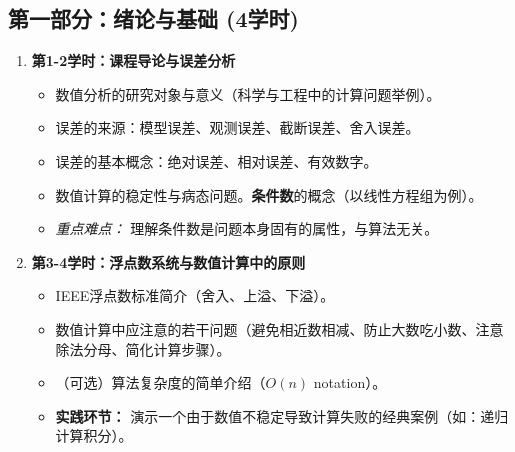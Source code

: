 \documentclass[12pt, a4paper]{article} %
\begin{document}
	\subsection{第一部分：绪论与基础 (4学时)}
	\begin{enumerate}
		\item \textbf{第1-2学时：课程导论与误差分析}
		\begin{itemize}
			\item 数值分析的研究对象与意义（科学与工程中的计算问题举例）。
			\item 误差的来源：模型误差、观测误差、截断误差、舍入误差。
			\item 误差的基本概念：绝对误差、相对误差、有效数字。
			\item 数值计算的稳定性与病态问题。\textbf{条件数}的概念（以线性方程组为例）。
			\item \textit{重点难点：} 理解条件数是问题本身固有的属性，与算法无关。
		\end{itemize}
		
		\item \textbf{第3-4学时：浮点数系统与数值计算中的原则}
		\begin{itemize}
			\item IEEE浮点数标准简介（舍入、上溢、下溢）。
			\item 数值计算中应注意的若干问题（避免相近数相减、防止大数吃小数、注意除法分母、简化计算步骤）。
			\item （可选）算法复杂度的简单介绍（$O(n)$ notation）。
			\item \textbf{实践环节：} 演示一个由于数值不稳定导致计算失败的经典案例（如：递归计算积分）。
		\end{itemize}
	\end{enumerate}
	
\end{document}
